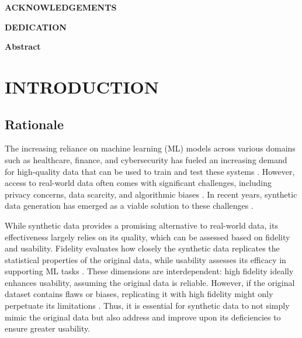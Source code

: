 \documentclass{article}
\begin{document}
\newpage

\begin{center}
\Large\textbf{ACKNOWLEDGEMENTS}
\end{center}

\vspace{1em} %

\newpage

\begin{center}
\Large\textbf{DEDICATION}
\end{center}

\vspace{1em} %

\newpage

\begin{center}
\Large\textbf{Abstract}
\end{center}

\vspace{1em} %

\newpage
\tableofcontents
\thispagestyle{empty} %
\newpage

\setcounter{page}{1}
\section{INTRODUCTION}

\subsection{Rationale}
The increasing reliance on machine learning (ML) models across various domains such as healthcare, finance, and cybersecurity has fueled an increasing demand for high-quality data that can be used to train and test these systems \parencite{jordon_synthetic_2022, goyal_systematic_2024}. However, access to real-world data often comes with significant challenges, including privacy concerns, data scarcity, and algorithmic biases \parencite{lu_machine_2024, hudovernik_benchmarking_2024}. In recent years, synthetic data generation has emerged as a viable solution to these challenges \parencite{goyal_systematic_2024}.

While synthetic data provides a promising alternative to real-world data, its effectiveness largely relies on its quality, which can be assessed based on fidelity and usability. Fidelity evaluates how closely the synthetic data replicates the statistical properties of the original data, while usability assesses its efficacy in supporting ML tasks \parencite{loni_review_2025}. These dimensions are interdependent: high fidelity ideally enhances usability, assuming the original data is reliable. However, if the original dataset contains flaws or biases, replicating it with high fidelity might only perpetuate its limitations \parencite{shahul_hameed_bias_2024}. Thus, it is essential for synthetic data to not simply mimic the original data but also address and improve upon its deficiencies to ensure greater usability.
\end{document}
